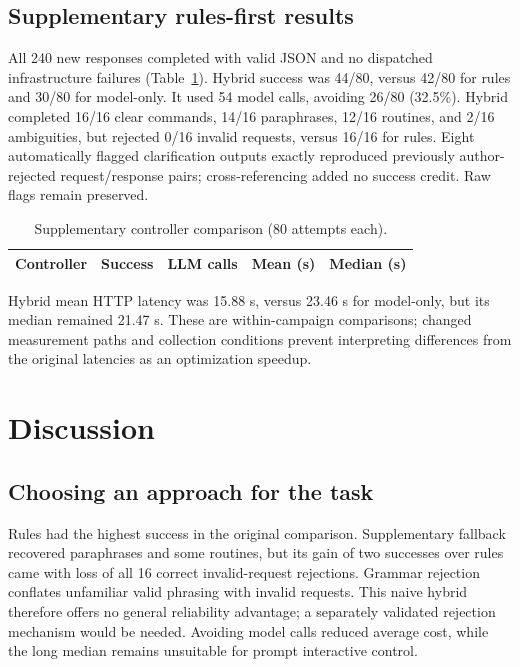 \documentclass[letterpaper,conference]{IEEEtran}
\providecommand{\StudyPrefix}{}
\begin{document}
\subsection{Supplementary rules-first results}
All 240 new responses completed with valid JSON and no dispatched infrastructure failures (Table~\ref{tab:hybrid}). Hybrid success was 44/80, versus 42/80 for rules and 30/80 for model-only. It used 54 model calls, avoiding 26/80 (32.5\%). Hybrid completed 16/16 clear commands, 14/16 paraphrases, 12/16 routines, and 2/16 ambiguities, but rejected 0/16 invalid requests, versus 16/16 for rules. Eight automatically flagged clarification outputs exactly reproduced previously author-rejected request/response pairs; cross-referencing added no success credit. Raw flags remain preserved.
\begin{table}[t]\caption{Supplementary controller comparison (80 attempts each).}
\centering\footnotesize\setlength{\tabcolsep}{4pt}\begin{tabular}{lrrrr}\toprule
Controller & Success & LLM calls & Mean (s) & Median (s)\\\midrule

\end{tabular}\label{tab:hybrid}\end{table}

Hybrid mean HTTP latency was 15.88 s, versus 23.46 s for model-only, but its median remained 21.47 s. These are within-campaign comparisons; changed measurement paths and collection conditions prevent interpreting differences from the original latencies as an optimization speedup.

\section{Discussion}
\subsection{Choosing an approach for the task}
Rules had the highest success in the original comparison. Supplementary fallback recovered paraphrases and some routines, but its gain of two successes over rules came with loss of all 16 correct invalid-request rejections. Grammar rejection conflates unfamiliar valid phrasing with invalid requests. This naive hybrid therefore offers no general reliability advantage; a separately validated rejection mechanism would be needed. Avoiding model calls reduced average cost, while the long median remains unsuitable for prompt interactive control.
\end{document}
